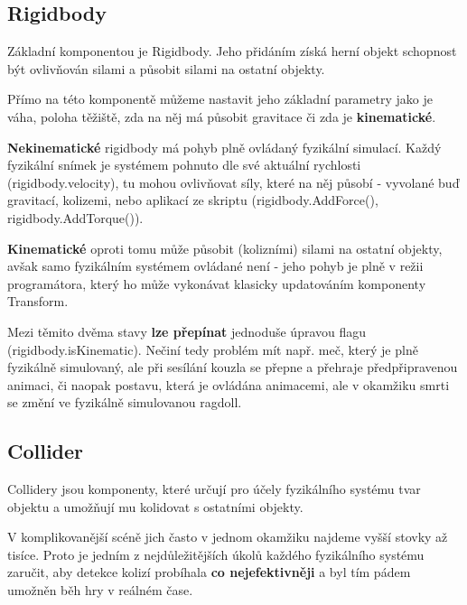\subsection{Rigidbody}

Základní komponentou je Rigidbody. Jeho přidáním získá herní objekt schopnost být ovlivňován silami a působit silami na ostatní objekty.

Přímo na této komponentě můžeme nastavit jeho základní parametry jako je váha, poloha těžiště, zda na něj má působit gravitace či zda je \textbf{kinematické}.

\textbf{Nekinematické} rigidbody má pohyb plně ovládaný fyzikální simulací. Každý fyzikální snímek je systémem pohnuto dle své aktuální rychlosti (rigidbody.velocity), tu mohou ovlivňovat síly, které na něj působí - vyvolané buď gravitací, kolizemi, nebo aplikací ze skriptu (rigidbody.AddForce(), rigidbody.AddTorque()).

\textbf{Kinematické} oproti tomu může působit (kolizními) silami na ostatní objekty, avšak samo fyzikálním systémem ovládané není - jeho pohyb je plně v režii programátora, který ho může vykonávat klasicky updatováním komponenty Transform.

Mezi těmito dvěma stavy \textbf{lze přepínat} jednoduše úpravou flagu (rigidbody.isKinematic). Nečiní tedy problém mít např. meč, který je plně fyzikálně simulovaný, ale při sesílání kouzla se přepne a přehraje předpřipravenou animaci, či naopak postavu, která je ovládána animacemi, ale v okamžiku smrti se změní ve fyzikálně simulovanou ragdoll.

\subsection{Collider}

Collidery jsou komponenty, které určují pro účely fyzikálního systému tvar objektu a umožňují mu kolidovat s ostatními objekty. 

V komplikovanější scéně jich často v jednom okamžiku najdeme vyšší stovky až tisíce. Proto je jedním z nejdůležitějších úkolů každého fyzikálního systému zaručit, aby detekce kolizí probíhala \textbf{co nejefektivněji} a byl tím pádem umožněn běh hry v reálném čase.

